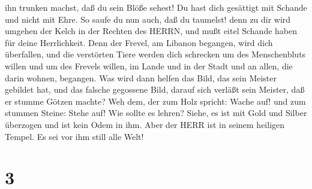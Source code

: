 ihn trunken machst, daß du sein Blöße sehest!  Du hast dich
gesättigt mit Schande und nicht mit Ehre. So saufe du nun auch, daß du
taumelst! denn zu dir wird umgehen der Kelch in der Rechten des HERRN,
und mußt eitel Schande haben für deine Herrlichkeit.  Denn
der Frevel, am Libanon begangen, wird dich überfallen, und die
verstörten Tiere werden dich schrecken um des Menschenbluts willen und
um des Frevels willen, im Lande und in der Stadt und an allen, die darin
wohnen, begangen.  Was wird dann helfen das Bild, das sein
Meister gebildet hat, und das falsche gegossene Bild, darauf sich
verläßt sein Meister, daß er stumme Götzen machte?  Weh
dem, der zum Holz spricht: Wache auf! und zum stummen Steine: Stehe auf!
Wie sollte es lehren? Siehe, es ist mit Gold und Silber überzogen und
ist kein Odem in ihm.  Aber der HERR ist in seinem heiligen
Tempel. Es sei vor ihm still alle Welt!

\hypertarget{section-2}{%
\section{3}\label{section-2}}

